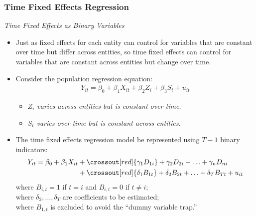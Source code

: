 

\begin{frame}
\frametitle{Time Fixed Effects Regression}
\emph{Time Fixed Effects as Binary Variables}
\begin{itemize}
\item Just as fixed effects for each entity can control for variables that are constant over time but differ across entities, so time fixed effects can control for variables that are constant across entities but change over time.
\item Consider the population regression equation:
\begin{align*}
Y_{it} = \beta_{0} + \beta_{1} X_{it} + \beta_{2} Z_{i} + \beta_{3} S_{t} + u_{it}
\end{align*}\vspace*{-2ex}
\begin{itemize}
\item \emph{$Z_{i}$ varies across entities but is constant over time.}
\item \emph{$S_{t}$ varies over time but is constant across entities.}
\end{itemize}
\item The time fixed effects regression model be represented using $T-1$ binary indicators:
\begin{align*}
Y_{it} = \beta_{0} + \beta_{1} X_{it} 
       & + \crossout[red]{\gamma_{1}D_{1i}} + \gamma_{2}D_{2i} + \ldots + \gamma_{n}D_{ni}\\
       & + \crossout[red]{\delta_{1}B_{1t}} + \delta_{2}B_{2t} + \ldots + \delta_{T}B_{Tt} + u_{it}
\end{align*}
where $B_{i,t}=1$ if $t=i$ and $B_{i,t}=0$ if $t\ne i$;\\ 
where $\delta_{2},\ldots,\delta_{T}$ are coefficients to be estimated;\\
where $B_{1,t}$ is excluded to avoid the ``dummy variable trap.'' 
\end{itemize}
\end{frame}


